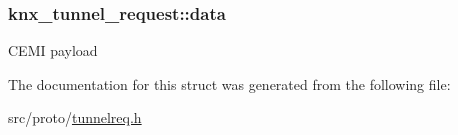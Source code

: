 \subsubsection[{\texorpdfstring{data}{data}}]{ knx\+\_\+tunnel\+\_\+request\+::data}\hypertarget{structknx__tunnel__request_ae9fad51a8486998118c72419d7e6ac4f}{}\label{structknx__tunnel__request_ae9fad51a8486998118c72419d7e6ac4f}
C\+E\+MI payload 

The documentation for this struct was generated from the following file\+:\begin{DoxyCompactItemize}
\item 
src/proto/\hyperlink{tunnelreq_8h}{tunnelreq.\+h}\end{DoxyCompactItemize}
